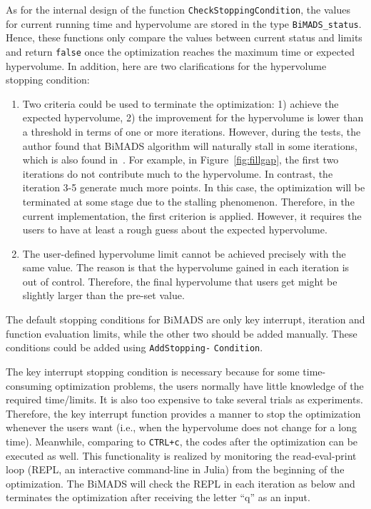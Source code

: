 \documentclass[11pt,oneside,onecolumn,openright]{article}
\begin{document}
  As for the internal design of the function \verb|CheckStoppingCondition|, the values for current running time and hypervolume are stored in the type \verb|BiMADS_status|. Hence, these functions only compare the values between current status and limits and return \verb|false| once the optimization reaches the maximum time or expected hypervolume. In addition, here are two clarifications for the hypervolume stopping condition:
  \begin{enumerate}
    \item Two criteria could be used to terminate the optimization: 1) achieve the expected hypervolume, 2) the improvement for the hypervolume is lower than a threshold in terms of one or more iterations. However, during the tests, the author found that BiMADS algorithm will naturally stall in some iterations, which is also found in~\cite{bigeon2021dmulti}. For example, in Figure~\ref{fig:fillgap}, the first two iterations do not contribute much to the hypervolume. In contrast, the iteration 3-5 generate much more points. In this case, the optimization will be terminated at some stage due to the stalling phenomenon. Therefore, in the current implementation, the first criterion is applied. However, it requires the users to have at least a rough guess about the expected hypervolume.
    \item The user-defined hypervolume limit cannot be achieved precisely with the same value. The reason is that the hypervolume gained in each iteration is out of control. Therefore, the final hypervolume that users get might be slightly larger than the pre-set value.
  \end{enumerate}

  The default stopping conditions for BiMADS are only key interrupt, iteration and function evaluation limits, while the other two should be added manually. These conditions could be added using \verb|AddStopping-| \verb|Condition|.

  The key interrupt stopping condition is necessary because for some time-consuming optimization problems, the users normally have little knowledge of the required time/limits. It is also too expensive to take several trials as experiments. Therefore, the key interrupt function provides a manner to stop the optimization whenever the users want (i.e., when the hypervolume does not change for a long time). Meanwhile, comparing to \verb|CTRL+c|, the codes after the optimization can be executed as well. This functionality is realized by monitoring the read-eval-print loop (REPL, an interactive command-line in Julia) from the beginning of the optimization. The BiMADS will check the REPL in each iteration as below and terminates the optimization after receiving the letter ``q'' as an input.
\end{document}
